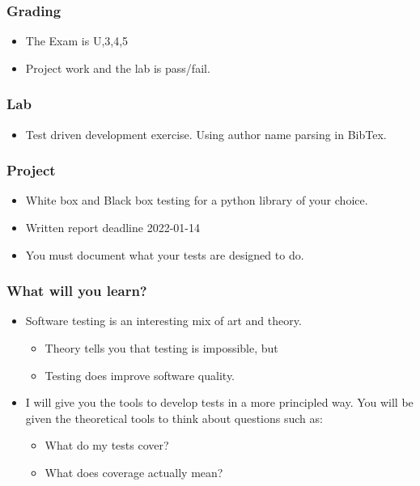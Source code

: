 \documentclass{beamer}
\begin{document}
\begin{frame}
  \frametitle{Grading}
  \begin{itemize}
  \item The Exam is U,3,4,5
  \item Project work and the lab is pass/fail.
  \end{itemize}
\end{frame}
\begin{frame}
  \frametitle{Lab}
  \begin{itemize}
  \item Test driven development exercise. Using author name parsing in
    BibTex. 
  \end{itemize}
\end{frame}
\begin{frame}
  \frametitle{Project}
  \begin{itemize}
  \item White box and Black box testing for a python library of your choice.
  \item Written report deadline 2022-01-14
  \item You must document what your tests are designed to do.
  \end{itemize}
\end{frame}
%
\begin{frame}
  \frametitle{What will you learn?}
  \begin{itemize}
  \item Software testing is an interesting mix of art and theory.
    \begin{itemize}
    \item Theory tells you that testing is impossible, but
    \item Testing does improve software quality.
    \end{itemize}
  \item I will give you the tools to develop tests in a more
    principled way. You will be given the theoretical tools to think
    about questions such as:
    \begin{itemize}
    \item What do my tests cover?
    \item What does coverage actually mean? 
    \end{itemize}
  \end{itemize}
\end{frame}
\end{document}
